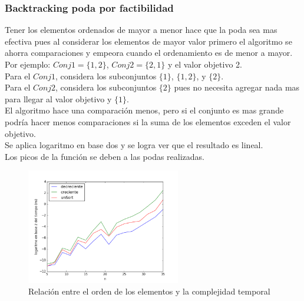 \subsubsection{Backtracking poda por factibilidad}
Tener los elementos ordenados de mayor a menor hace que la poda sea mas efectiva pues al considerar los elementos de mayor valor primero el algoritmo se ahorra comparaciones y empeora cuando el ordenamiento es de menor a mayor.\\ 
Por ejemplo: $Conj1 = \{1,2\}$, $Conj2 = \{2,1\}$ y el valor objetivo 2. \\
Para el $Conj1$, considera los subconjuntos $\{ 1\}$, $\{ 1,2\}$, y $\{2\}$.\\
Para el $Conj2$, considera los subconjuntos $\{2\}$ pues no necesita agregar nada mas para llegar al valor objetivo y $\{1\}$.\\
El algoritmo hace una comparación menos, pero si el conjunto es mas grande podría hacer menos comparaciones si la suma de los elementos exceden el valor objetivo.\\
Se aplica logaritmo en base dos y se logra ver que el resultado es lineal.\\
Los picos de la función se deben a las podas realizadas.\\
\begin{figure}[h]
\centering
\includegraphics[width=0.6\textwidth]{facSort.png}
\caption{Relación entre el orden de los elementos y la complejidad temporal}
\end{figure}

